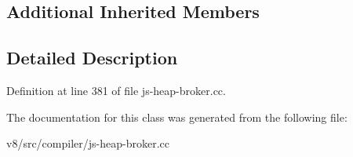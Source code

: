 \subsection*{Additional Inherited Members}


\subsection{Detailed Description}


Definition at line 381 of file js-\/heap-\/broker.\+cc.



The documentation for this class was generated from the following file\+:\begin{DoxyCompactItemize}
\item 
v8/src/compiler/js-\/heap-\/broker.\+cc\end{DoxyCompactItemize}
